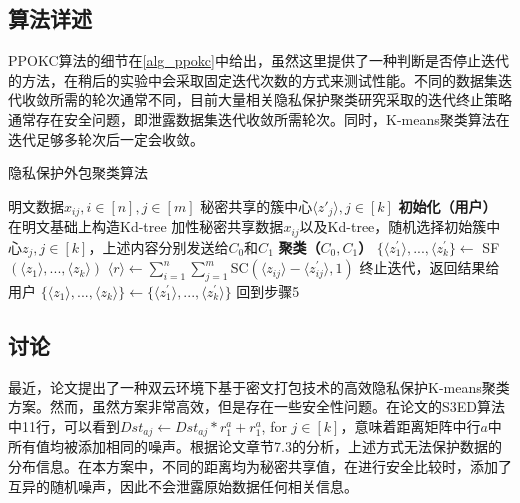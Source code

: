\subsection{算法详述}
PPOKC算法的细节在\ref{alg_ppokc}中给出，虽然这里提供了一种判断是否停止迭代的方法，在稍后的实验中会采取固定迭代次数的方式来测试性能。不同的数据集迭代收敛所需的轮次通常不同，目前大量相关隐私保护聚类研究采取的迭代终止策略通常存在安全问题，即泄露数据集迭代收敛所需轮次。同时，K-means聚类算法在迭代足够多轮次后一定会收敛\cite{mohassel2019practical}。
\begin{algorithm}[htbp]
	\renewcommand{\algorithmicrequire}{\textbf{输入:}}
	\renewcommand{\algorithmicensure}{\textbf{输出:}}
	\caption{隐私保护外包聚类算法}
	\label{alg_ppokc}
	\begin{algorithmic}[1]
		\REQUIRE 明文数据$x_{ij},i\in[n],j\in[m]$
		\ENSURE 秘密共享的簇中心$\langle z'_j \rangle,j\in[k]$
		\STATE \textbf{初始化（用户）}
		\STATE 在明文基础上构造Kd-tree
		\STATE 加性秘密共享数据$x_{ij}$以及Kd-tree，随机选择初始簇中心$z_j,j\in[k]$，上述内容分别发送给$C_0$和$C_1$
		\STATE \textbf{聚类（$C_0,C_1$）}
		\STATE $\{\langle z^{\prime}_1 \rangle,...,\langle z^{\prime}_k\} \leftarrow$ SF$(\langle z_1\rangle,...,\langle z_k\rangle)$
		\STATE $\langle r \rangle \leftarrow \sum_{i=1}^{n}\sum_{j=1}^{m}$SC$(\langle z_{ij}\rangle-\langle z_{ij}^{\prime}\rangle, 1)$
		\STATE 终止迭代，返回结果给用户
		\ELSE
		\STATE $\{\langle z_1 \rangle,...,\langle z_k \rangle \} \leftarrow \{\langle z^{\prime}_1 \rangle,...,\langle z^{\prime}_k\rangle\}$
		\STATE 回到步骤5
		\ENDIF
	\end{algorithmic}
\end{algorithm}

\subsection{讨论}
\label{taolun}
最近，论文\cite{wu2020secure}提出了一种双云环境下基于密文打包技术的高效隐私保护K-means聚类方案。然而，虽然方案非常高效，但是存在一些安全性问题。在论文\cite{wu2020secure}的S3ED算法中11行，可以看到$D s t_{a j} \leftarrow Dst_{a j} * r_1^a+r_1^a$, for $j \in[k]$，意味着距离矩阵中行$ a $中所有值均被添加相同的噪声。根据论文\cite{liu2019toward}章节7.3的分析，上述方式无法保护数据的分布信息。在本方案中，不同的距离均为秘密共享值，在进行安全比较时，添加了互异的随机噪声，因此不会泄露原始数据任何相关信息。


